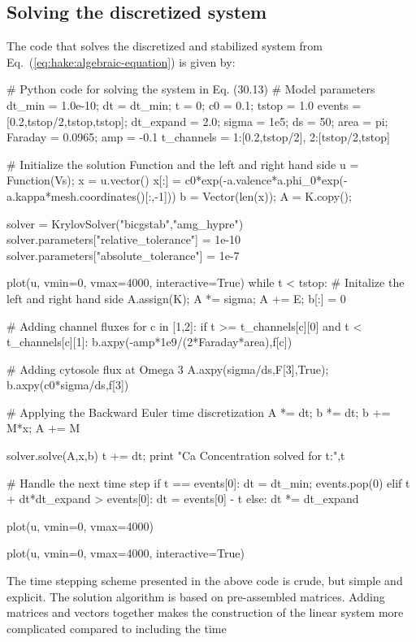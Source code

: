 \subsection*{Solving the discretized system}
The \pydolfin code that solves the discretized and stabilized system from Eq.~(\ref{eq:hake:algebraic-equation}) is given by:
\begin{python}
# Python code for solving the system in Eq. (30.13)
# Model parameters
dt_min = 1.0e-10; dt = dt_min; t = 0; c0 = 0.1; tstop = 1.0
events = [0.2,tstop/2,tstop,tstop]; dt_expand = 2.0;
sigma = 1e5; ds = 50; area = pi; Faraday = 0.0965; amp = -0.1
t_channels = {1:[0.2,tstop/2], 2:[tstop/2,tstop]}

# Initialize the solution Function and the left and right hand side
u = Function(Vs); x = u.vector()
x[:] = c0*exp(-a.valence*a.phi_0*exp(-a.kappa*mesh.coordinates()[:,-1]))
b = Vector(len(x)); A = K.copy();

solver = KrylovSolver("bicgstab","amg_hypre")
solver.parameters["relative_tolerance"] = 1e-10
solver.parameters["absolute_tolerance"] = 1e-7

plot(u, vmin=0, vmax=4000, interactive=True)
while t < tstop:
    # Initalize the left and right hand side
    A.assign(K); A *= sigma; A += E; b[:] = 0

    # Adding channel fluxes
    for c in [1,2]:
        if t >= t_channels[c][0] and t < t_channels[c][1]:
            b.axpy(-amp*1e9/(2*Faraday*area),f[c])

    # Adding cytosole flux at Omega 3
    A.axpy(sigma/ds,F[3],True); b.axpy(c0*sigma/ds,f[3])

    # Applying the Backward Euler time discretization
    A *= dt; b *= dt; b += M*x; A += M

    solver.solve(A,x,b)
    t += dt; print "Ca Concentration solved for t:",t

    # Handle the next time step
    if t == events[0]:
        dt = dt_min; events.pop(0)
    elif t + dt*dt_expand > events[0]:
        dt = events[0] - t
    else:
        dt *= dt_expand

    plot(u, vmin=0, vmax=4000)

plot(u, vmin=0, vmax=4000, interactive=True)
\end{python}
The time stepping scheme presented in the above code is crude, but
simple and explicit. The solution algorithm is based on pre-assembled
matrices. Adding matrices and vectors together makes the construction
of the linear system more complicated compared to including the time
